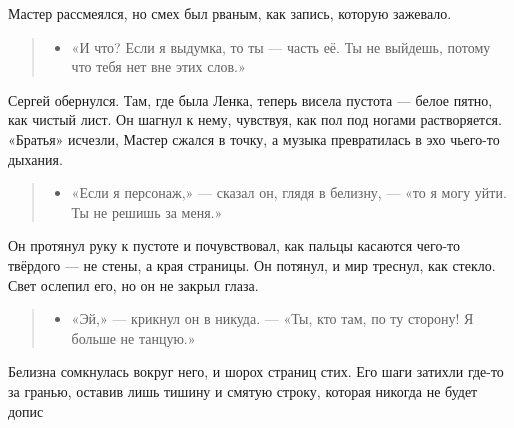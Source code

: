 \documentclass[12pt,a4paper]{book}
\newenvironment{dialogue}{\begin{quote}\itshape\begin{itemize}\item[]}{\end{itemize}\end{quote}}
\begin{document}
Мастер рассмеялся, но смех был рваным, как запись, которую зажевало.

\begin{dialogue}
«И что? Если я выдумка, то ты — часть её. Ты не выйдешь, потому что тебя нет вне этих слов.»
\end{dialogue}

Сергей обернулся. Там, где была Ленка, теперь висела пустота --- белое пятно, как чистый лист. Он шагнул к нему, чувствуя, как пол под ногами растворяется. «Братья» исчезли, Мастер сжался в точку, а музыка превратилась в эхо чьего-то дыхания.

\begin{dialogue}
«Если я персонаж,» --- сказал он, глядя в белизну, --- «то я могу уйти. Ты не решишь за меня.»
\end{dialogue}

Он протянул руку к пустоте и почувствовал, как пальцы касаются чего-то твёрдого --- не стены, а края страницы. Он потянул, и мир треснул, как стекло. Свет ослепил его, но он не закрыл глаза.

\begin{dialogue}
«Эй,» --- крикнул он в никуда. --- «Ты, кто там, по ту сторону! Я больше не танцую.»
\end{dialogue}

Белизна сомкнулась вокруг него, и шорох страниц стих. Его шаги затихли где-то за гранью, оставив лишь тишину и смятую строку, которая никогда не будет допис
\end{document}
